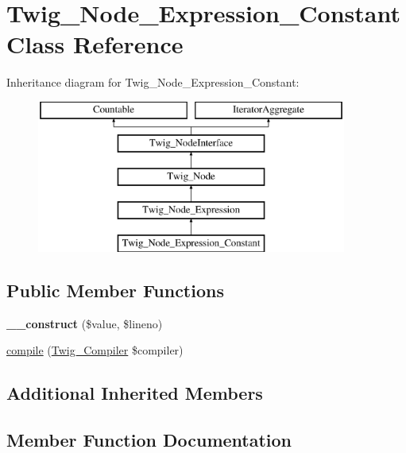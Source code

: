 \hypertarget{classTwig__Node__Expression__Constant}{}\section{Twig\+\_\+\+Node\+\_\+\+Expression\+\_\+\+Constant Class Reference}
\label{classTwig__Node__Expression__Constant}
Inheritance diagram for Twig\+\_\+\+Node\+\_\+\+Expression\+\_\+\+Constant\+:\begin{figure}[H]
\begin{center}
\leavevmode
\includegraphics[height=5.000000cm]{classTwig__Node__Expression__Constant}
\end{center}
\end{figure}
\subsection*{Public Member Functions}
\begin{DoxyCompactItemize}
\item 
{\bfseries \+\_\+\+\_\+construct} (\$value, \$lineno)\hypertarget{classTwig__Node__Expression__Constant_aa5ccb9a58da3820db0bb8b2977d271a6}{}\label{classTwig__Node__Expression__Constant_aa5ccb9a58da3820db0bb8b2977d271a6}

\item 
\hyperlink{classTwig__Node__Expression__Constant_a9203b18e971c79443d2f12b102f1d967}{compile} (\hyperlink{classTwig__Compiler}{Twig\+\_\+\+Compiler} \$compiler)
\end{DoxyCompactItemize}
\subsection*{Additional Inherited Members}


\subsection{Member Function Documentation}
